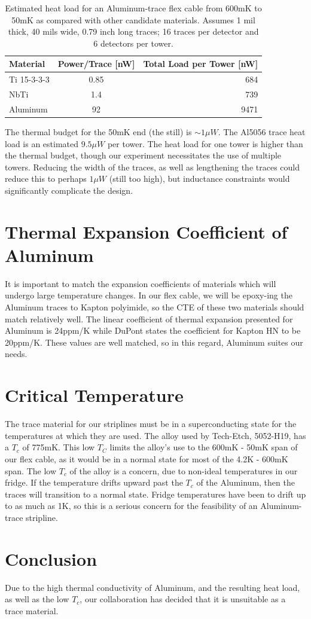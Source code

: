 \documentclass{report}
\begin{document}
\begin{table}
\begin{threeparttable}
\begin{tabular}{l|c|r}
\toprule
Material & Power/Trace [nW] & Total Load per Tower [nW] \\
\midrule
Ti 15-3-3-3 & 0.85 & 684 \\
NbTi & 1.4 & 739 \\
Aluminum & 92 & 9471 \\
\bottomrule
\end{tabular}
\end{threeparttable}
\caption{Estimated heat load for an Aluminum-trace flex cable from 600mK to 50mK as compared with other candidate materials. Assumes 1 mil thick, 40 mils wide, 0.79 inch long traces; 16 traces per detector and 6 detectors per tower.}
\end{table}

The thermal budget for the 50mK end (the still) is $\sim 1 \mu W$. The Al5056 trace heat load is an estimated $9.5 \mu W$ per tower. The heat load for one tower is higher than the thermal budget, though our experiment necessitates the use of multiple towers. Reducing the width of the traces, as well as lengthening the traces could reduce this to perhaps $1\mu W$ (still too high), but inductance constraints would significantly complicate the design.


\section{Thermal Expansion Coefficient of Aluminum}
It is important to match the expansion coefficients of materials which will undergo large temperature changes. In our flex cable, we will be epoxy-ing the Aluminum traces to Kapton polyimide, so the CTE of these two materials should match relatively well. The linear coefficient of thermal expansion presented for Aluminum is 24ppm/K while DuPont states the coefficient for Kapton HN to be 20ppm/K. These values are well matched, so in this regard, Aluminum suites our needs.

\section{Critical Temperature}

The trace material for our striplines must be in a superconducting state for the temperatures at which they are used. The alloy used by Tech-Etch, 5052-H19, has a $T_{c}$ of 775mK. This low $T_{C}$ limits the alloy's use to the 600mK - 50mK span of our flex cable, as it would be in a normal state for most of the 4.2K - 600mK span. The low $T_{c}$ of the alloy is a concern, due to non-ideal temperatures in our fridge. If the temperature drifts upward past the $T_{c}$ of the Aluminum, then the traces will transition to a normal state. Fridge temperatures have been to drift up to as much as 1K, so this is a serious concern for the feasibility of an Aluminum-trace stripline.

\section{Conclusion}

Due to the high thermal conductivity of Aluminum, and the resulting heat load, as well as the low $T_{c}$, our collaboration has decided that it is unsuitable as a trace material.

\newpage


\end{document}
